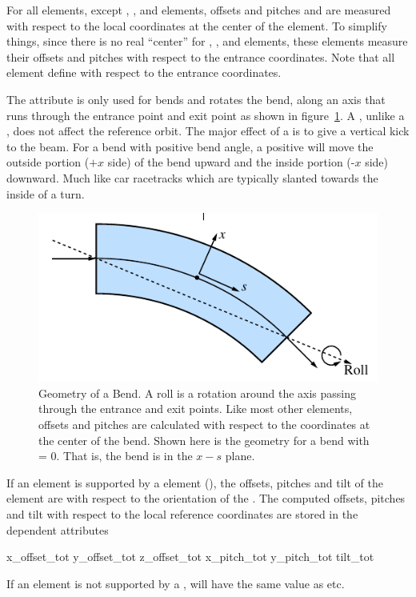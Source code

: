 For all elements, except , , and
 elements, offsets and pitches and are measured
with respect to the local coordinates at the center of the element. To
simplify things, since there is no real ``center'' for ,
, and  elements, these elements
measure their offsets and pitches with respect to the entrance
coordinates.  Note that all element define  with respect to
the entrance coordinates.

The  attribute is only used for bends and rotates the bend,
along an axis that runs through the entrance point and exit point as
shown in figure~\ref{f:roll}. A , unlike a , does not affect the
reference orbit. The major effect of a  is to give a vertical
kick to the beam. For a bend with positive bend angle, a positive
 will move the outside portion ($+x$ side) of the bend upward
and the inside portion (-$x$ side) downward. Much like car racetracks
which are typically slanted towards the inside of a turn.

\begin{figure}[ht]
  \centering
  \includegraphics{roll.pdf}
  \caption[Geometry of a Bend]{
Geometry of a Bend. A roll is a rotation around the axis passing
through the entrance and exit points. Like most other elements,
offsets and pitches are calculated with respect to the coordinates at
the center of the bend. Shown here is the geometry for a bend with
 = 0. That is, the bend is in the $x-s$ plane.}
  \label{f:roll}
\end{figure}

If an element is supported by a  element (),
the offsets, pitches and tilt of the element are with respect to the
orientation of the . The computed offsets, pitches and tilt with
respect to the local reference coordinates are stored in the dependent attributes
\begin{example}
  x_offset_tot
  y_offset_tot
  z_offset_tot
  x_pitch_tot
  y_pitch_tot
  tilt_tot
\end{example}
If an element is not supported by a , 
will have the same value as  etc.

